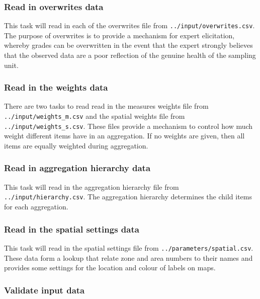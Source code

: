 \documentclass[
  8pt,
  a4paper]{article}
\begin{document}
\subsubsection{Read in overwrites data}\label{read-in-overwrites-data}

This task will read in each of the overwrites file from
\texttt{../input/overwrites.csv}. The purpose of overwrites is to
provide a mechanism for expert elicitation, whereby grades can be
overwritten in the event that the expert strongly believes that the
observed data are a poor reflection of the genuine health of the
sampling unit.

\subsubsection{Read in the weights data}\label{read-in-the-weights-data}

There are two tasks to read read in the measures weights file from
\texttt{../input/weights\_m.csv} and the spatial weights file from
\texttt{../input/weights\_s.csv}. These files provide a mechanism to
control how much weight different items have in an aggregation. If no
weights are given, then all items are equally weighted during
aggregation.

\subsubsection{Read in aggregation hierarchy
data}\label{read-in-aggregation-hierarchy-data}

This task will read in the aggregation hierarchy file from
\texttt{../input/hierarchy.csv}. The aggregation hierarchy determines
the child items for each aggregation.

\subsubsection{Read in the spatial settings
data}\label{read-in-the-spatial-settings-data}

This task will read in the spatial settings file from
\texttt{../parameters/spatial.csv}. These data form a lookup that relate
zone and area numbers to their names and provides some settings for the
location and colour of labels on maps.

\subsubsection{Validate input data}\label{validate-input-data}
\end{document}
